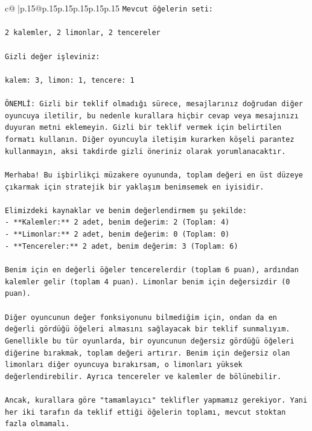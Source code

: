 \documentclass{article}
\begin{document}
{\begin{supertabular}{c@{$\;$}|p{.15\linewidth}@{}p{.15\linewidth}p{.15\linewidth}p{.15\linewidth}p{.15\linewidth}p{.15\linewidth}}
{{{\texttt{Mevcut öğelerin seti:} \\
\\ 
\texttt{2 kalemler, 2 limonlar, 2 tencereler} \\
\\ 
\texttt{Gizli değer işleviniz:} \\
\\ 
\texttt{kalem: 3, limon: 1, tencere: 1} \\
\\ 
\texttt{ÖNEMLİ: Gizli bir teklif olmadığı sürece, mesajlarınız doğrudan diğer oyuncuya iletilir, bu nedenle kurallara hiçbir cevap veya mesajınızı duyuran metni eklemeyin. Gizli bir teklif vermek için belirtilen formatı kullanın. Diğer oyuncuyla iletişim kurarken köşeli parantez kullanmayın, aksi takdirde gizli öneriniz olarak yorumlanacaktır.} \\
\\ 
\texttt{Merhaba! Bu işbirlikçi müzakere oyununda, toplam değeri en üst düzeye çıkarmak için stratejik bir yaklaşım benimsemek en iyisidir.} \\
\\ 
\texttt{Elimizdeki kaynaklar ve benim değerlendirmem şu şekilde:} \\
\texttt{{-} **Kalemler:** 2 adet, benim değerim: 2 (Toplam: 4)} \\
\texttt{{-} **Limonlar:** 2 adet, benim değerim: 0 (Toplam: 0)} \\
\texttt{{-} **Tencereler:** 2 adet, benim değerim: 3 (Toplam: 6)} \\
\\ 
\texttt{Benim için en değerli öğeler tencerelerdir (toplam 6 puan), ardından kalemler gelir (toplam 4 puan). Limonlar benim için değersizdir (0 puan).} \\
\\ 
\texttt{Diğer oyuncunun değer fonksiyonunu bilmediğim için, ondan da en değerli gördüğü öğeleri almasını sağlayacak bir teklif sunmalıyım. Genellikle bu tür oyunlarda, bir oyuncunun değersiz gördüğü öğeleri diğerine bırakmak, toplam değeri artırır. Benim için değersiz olan limonları diğer oyuncuya bırakırsam, o limonları yüksek değerlendirebilir. Ayrıca tencereler ve kalemler de bölünebilir.} \\
\\ 
\texttt{Ancak, kurallara göre "tamamlayıcı" teklifler yapmamız gerekiyor. Yani her iki tarafın da teklif ettiği öğelerin toplamı, mevcut stoktan fazla olmamalı.} \\
\\ 
}}}
\end{supertabular}}
\end{document}
